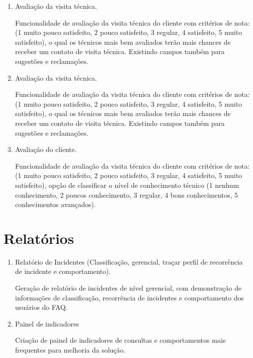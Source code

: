 \documentclass[
    12pt,               %
    openright,          %
    oneside,
    a4paper,            %
    english,            %
    brazil              %
   ]{ifsp-spo-inf-ctds}
\begin{document}
	\begin{enumerate}
		
		\item Avaliação da visita técnica.
		
		Funcionalidade de avaliação da visita técnica do cliente com critérios de nota:(1 muito pouco satisfeito, 2 pouco satisfeito, 3 regular, 4 satisfeito, 5 muito satisfeito), o qual os técnicos mais bem avaliados terão mais chances de receber um contato de visita técnica. Existindo campos também para sugestões e reclamações.
	
	
		\item Avaliação da visita técnica.
		
		Funcionalidade de avaliação da visita técnica do cliente com critérios de nota:(1 muito pouco satisfeito, 2 pouco satisfeito, 3 regular, 4 satisfeito, 5 muito satisfeito), o qual os técnicos mais bem avaliados terão mais chances de receber um contato de visita técnica. Existindo campos também para sugestões e reclamações.
	
		\item Avaliação do cliente.
		
		Funcionalidade de avaliação da visita técnica do cliente com critérios de nota:(1 muito pouco satisfeito, 2 pouco satisfeito, 3 regular, 4 satisfeito, 5 muito satisfeito), opção de classificar o nível de conhecimento técnico (1 nenhum conhecimento, 2 poucos conhecimento, 3 regular, 4 bons conhecimentos, 5 conhecimentos avançados).
	
	\end{enumerate}

\section{Relatórios}

	\begin{enumerate}

		\item 
		Relatório de Incidentes (Classificação, gerencial, traçar perfil de recorrência de incidente e comportamento).
		
		Geração de relatório de incidentes de nível gerencial, com demonstração de informações de classificação, recorrência de incidentes e comportamento dos usuários do FAQ.
	
		\item 
		Painel de indicadores
		
		Criação de painel de indicadores de consultas e comportamentos mais frequentes para melhoria da solução.

	\end{enumerate}
	
\end{document}
